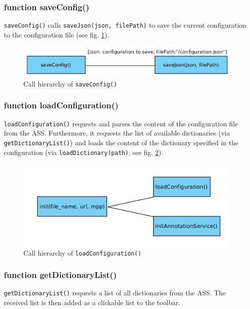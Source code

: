 \subsubsection{function saveConfig()}
\texttt{saveConfig()} calls \texttt{saveJson(json, filePath)} to save the current configuration to the configuration file (see fig. \ref{figB_saveConfig}).

\begin{figure}[H]
	\begin{center}
		\includegraphics[scale=0.5]{img/ch_saveConfig.png}
		\caption{Call hierarchy of \texttt{saveConfig()}}
		\label{figB_saveConfig}
	\end{center}
\end{figure}


\subsubsection{function loadConfiguration()}
\texttt{loadConfiguration()} requests and parses the content of the configuration file from the ASS. Furthermore, it requests the list of available dictionaries (via \texttt{getDictionaryList()}) and loads the content of the dictionary specified in the configuration (via \texttt{loadDictionary(path)}, see fig. \ref{figB_loadConfig}).

\begin{figure}[H]
	\begin{center}
		\includegraphics[scale=0.5]{img/ch_init.png}
		\caption{Call hierarchy of \texttt{loadConfiguration()}}
		\label{figB_loadConfig}
	\end{center}
\end{figure}


\subsubsection{function getDictionaryList()}
\texttt{getDictionaryList()} requests a list of all dictionaries from the ASS. The received list is then added as a clickable list to the toolbar.


